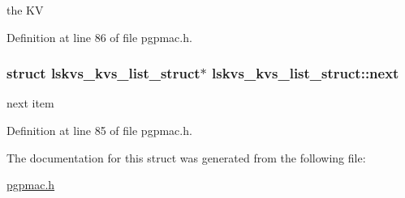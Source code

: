 the K\-V 



Definition at line 86 of file pgpmac.\-h.

\hypertarget{structlskvs__kvs__list__struct_aa3ed4d35bdda99bb1c08793633579edc}{
\subsubsection[{next}]{\setlength{\rightskip}{0pt plus 5cm}struct {\bf lskvs\-\_\-kvs\-\_\-list\-\_\-struct}$\ast$ lskvs\-\_\-kvs\-\_\-list\-\_\-struct\-::next}}\label{structlskvs__kvs__list__struct_aa3ed4d35bdda99bb1c08793633579edc}


next item 



Definition at line 85 of file pgpmac.\-h.



The documentation for this struct was generated from the following file\-:\begin{DoxyCompactItemize}
\item 
\hyperlink{pgpmac_8h}{pgpmac.\-h}\end{DoxyCompactItemize}
